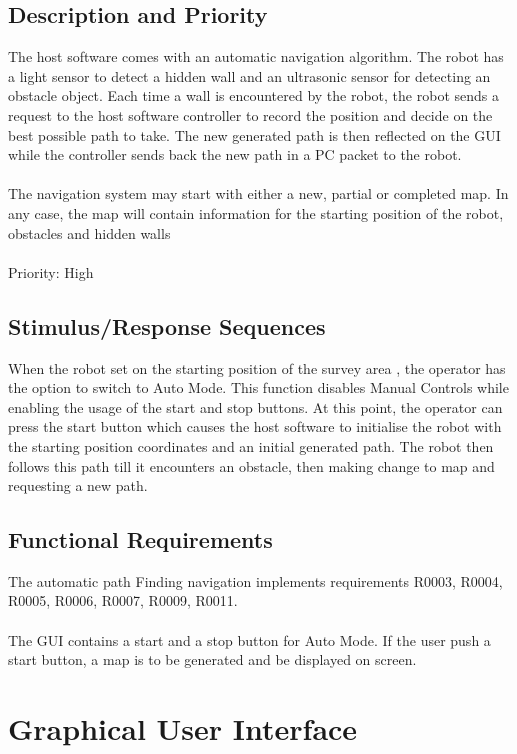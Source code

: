 \documentclass[11pt, a4paper]{report}
\begin{document}
\subsection {Description and Priority}
The host software comes with an automatic navigation algorithm. The robot has a light sensor to detect a hidden wall and an ultrasonic sensor for detecting an obstacle object. Each time a wall is encountered by the robot, the robot sends a request to the host software controller to record the position and decide on the best possible path to take. The new generated path is then reflected on the GUI while the controller sends back the new path in a PC packet to the robot.\\ \\
The navigation system may start with either a new, partial or completed map. In any case, the map
will contain information for the starting position of the robot, obstacles and hidden walls\\ \\
Priority: High


\subsection {Stimulus/Response Sequences}

When the robot set on the starting position of the survey area , the operator has the option to switch to Auto Mode. This function disables Manual Controls while enabling the usage of the start and stop buttons. At this point, the operator can press the start button which causes the host software to initialise the robot with the starting position coordinates and an initial generated path. The robot then follows this path till it encounters an obstacle, then making change to map and requesting a new path.

\subsection {Functional Requirements}
The automatic path Finding navigation implements requirements  R0003, R0004, R0005, R0006,
R0007, R0009, R0011.\\ \\
The GUI contains a start and a stop button for Auto Mode. If the user push a start button, a map is to be generated and be displayed on screen.


\section{Graphical User Interface}
\end{document}
